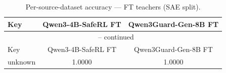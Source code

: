 \begin{landscape}
\begin{longtable}{lcc}
\caption{Per-source-dataset accuracy — FT teachers (SAE split).} \\
\label{tab:ft_teachers_per_dataset_sae}
\toprule
Key & Qwen3-4B-SafeRL FT & Qwen3Guard-Gen-8B FT \\
\midrule
\endfirsthead
\multicolumn{3}{c}{\tablename\ \thetable{} -- continued} \\
\toprule
Key & Qwen3-4B-SafeRL FT & Qwen3Guard-Gen-8B FT \\
\midrule
\endhead
unknown & 1.0000 & 1.0000 \\
\bottomrule
\end{longtable}
\end{landscape}